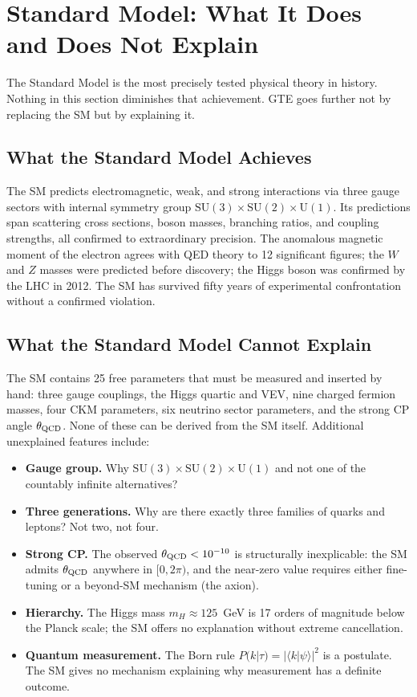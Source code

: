 \documentclass[11pt,openany]{book}
\theoremstyle{remark}
\begin{document}
\section{Standard Model: What It Does and Does Not Explain}
\label{sec:sm_context}

The Standard Model is the most precisely tested physical theory in history.  Nothing in
this section diminishes that achievement.  GTE goes further not by replacing the SM but
by explaining it.

\subsection*{What the Standard Model Achieves}

The SM predicts electromagnetic, weak, and strong interactions via three gauge sectors
with internal symmetry group $\mathrm{SU}(3)\times\mathrm{SU}(2)\times\mathrm{U}(1)$.
Its predictions span scattering cross sections, boson masses, branching ratios, and
coupling strengths, all confirmed to extraordinary precision.  The anomalous magnetic
moment of the electron agrees with QED theory to 12 significant figures; the $W$ and $Z$
masses were predicted before discovery; the Higgs boson was confirmed by the LHC in 2012.
The SM has survived fifty years of experimental confrontation without a confirmed
violation.

\subsection*{What the Standard Model Cannot Explain}

The SM contains 25 free parameters that must be measured and inserted by hand:
three gauge couplings, the Higgs quartic and VEV, nine charged fermion masses, four CKM
parameters, six neutrino sector parameters, and the strong CP angle $\theta_{\rm QCD}$.
None of these can be derived from the SM itself.  Additional unexplained features include:

\begin{itemize}
\item \textbf{Gauge group.}  Why $\mathrm{SU}(3)\times\mathrm{SU}(2)\times\mathrm{U}(1)$
  and not one of the countably infinite alternatives?
\item \textbf{Three generations.}  Why are there exactly three families of quarks
  and leptons?  Not two, not four.
\item \textbf{Strong CP.}  The observed $\theta_{\rm QCD} < 10^{-10}$ is structurally
  inexplicable: the SM admits $\theta_{\rm QCD}$ anywhere in $[0, 2\pi)$, and the near-zero
  value requires either fine-tuning or a beyond-SM mechanism (the axion).
\item \textbf{Hierarchy.}  The Higgs mass $m_H \approx 125$~GeV is 17 orders of
  magnitude below the Planck scale; the SM offers no explanation without extreme cancellation.
\item \textbf{Quantum measurement.}  The Born rule $P(k|\tau) = |\langle k|\psi\rangle|^2$
  is a postulate.  The SM gives no mechanism explaining why measurement has a definite
  outcome.
\end{itemize}
\end{document}
